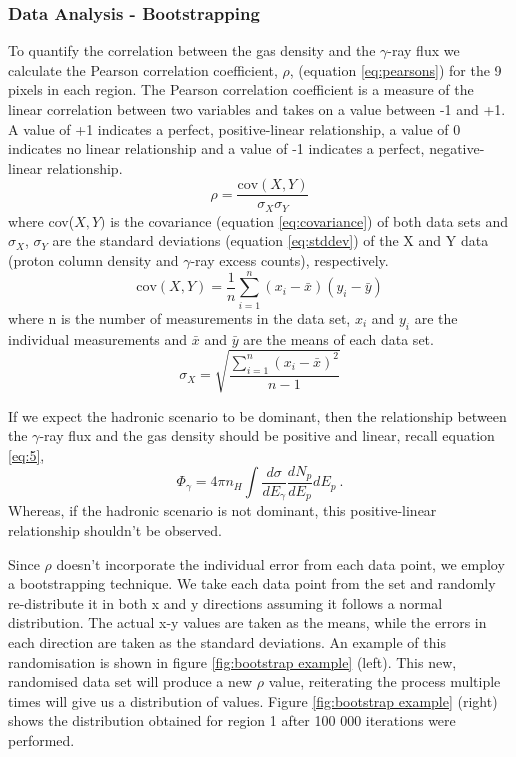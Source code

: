 \documentclass[12pt,a4paper]{article}
\begin{document}
\subsubsection{Data Analysis - Bootstrapping}
To quantify the correlation between the gas density and the $\gamma$-ray flux we calculate the Pearson correlation coefficient, $\rho$, (equation \ref{eq:pearsons}) for the 9 pixels in each region. The Pearson correlation coefficient is a measure of the linear correlation between two variables and takes on a value between -1 and +1. A value of +1 indicates a perfect, positive-linear relationship, a value of 0 indicates no linear relationship and a value of -1 indicates a perfect, negative-linear relationship. 
\begin{equation}\label{eq:pearsons}
\rho = \dfrac{\mathrm{cov}(X,Y)}{\sigma_X \sigma_Y}
\end{equation}
where cov($X,Y)$ is the covariance (equation \ref{eq:covariance}) of both data sets and $\sigma_X$, $\sigma_Y$ are the standard deviations (equation \ref{eq:stddev}) of the X and Y data (proton column density and $\gamma$-ray excess counts), respectively.
\begin{equation}\label{eq:covariance}
\mathrm{cov}(X,Y) = \dfrac{1}{n} \sum_{i=1}^n (x_i - \bar{x})(y_i - \bar{y})
\end{equation}
where n is the number of measurements in the data set, $x_i$ and $y_i$ are the individual measurements and $\bar{x}$ and $\bar{y}$ are the means of each data set.
\begin{equation}\label{eq:stddev}
\sigma_X = \sqrt{\dfrac{\sum_{i=1}^n (x_i - \bar{x})^2}{n -1}}
\end{equation}

If we expect the hadronic scenario to be dominant, then the relationship between the $\gamma$-ray flux and the gas density should be positive and linear, recall equation \ref{eq:5},
\begin{equation} 
\Phi_{\gamma} = 4 \pi n_H \int \dfrac{d\sigma}{dE_\gamma} \dfrac{dN_p}{dE_p} dE_p \ .
\end{equation}
Whereas, if the hadronic scenario is not dominant, this positive-linear relationship shouldn't be observed. 

Since $\rho$ doesn't incorporate the individual error from each data point, we employ a bootstrapping technique. 
We take each data point from the set and randomly re-distribute it in both x and y directions assuming it follows a normal distribution. 
The actual x-y values are taken as the means, while the errors in each direction are taken as the standard deviations. 
An example of this randomisation is shown in figure \ref{fig:bootstrap example} (left). 
This new, randomised data set will produce a new $\rho$ value, reiterating the process multiple times will give us a distribution of values. 
Figure \ref{fig:bootstrap example} (right) shows the distribution obtained for region 1 after 100 000 iterations were performed. 
\end{document}
